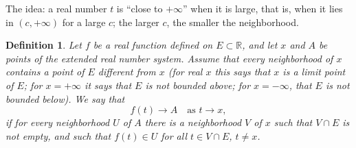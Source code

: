 \documentclass{article}
\theoremstyle{mythm}
\newtheorem{definition}[theorem]{Definition}
\begin{document}
The idea: a real number $t$ is ``close to $+\infty$'' when it is large, that is, when it lies in $(c, +\infty)$ for a large $c$; the larger $c$, the smaller the neighborhood.

\begin{definition}\label{def:extlimit}
Let $f$ be a real function defined on $E \subset \mathbb{R}$, and let $x$ and $A$ be points of the extended real number system. Assume that every neighborhood of $x$ contains a point of $E$ different from $x$ (for real $x$ this says that $x$ is a limit point of $E$; for $x = +\infty$ it says that $E$ is not bounded above; for $x = -\infty$, that $E$ is not bounded below). We say that
\[
f(t) \to A \quad \text{as } t \to x,
\]
if for every neighborhood $U$ of $A$ there is a neighborhood $V$ of $x$ such that $V \cap E$ is not empty, and such that $f(t) \in U$ for all $t \in V \cap E$, $t \neq x$.
\end{definition}
\end{document}
